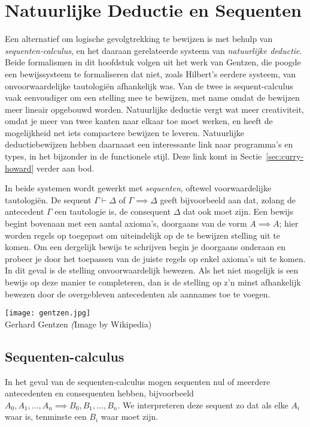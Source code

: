 \chapter{Natuurlijke Deductie en Sequenten}
Een alternatief om logische gevolgtrekking te bewijzen is met behulp van \emph{sequenten-calculus}, en het daaraan gerelateerde systeem van \emph{natuurlijke deductie}. Beide formalismen in dit hoofdstuk volgen uit het werk van Gentzen, die poogde een bewijssysteem te formaliseren dat niet, zoals Hilbert's eerdere systeem, van onvoorwaardelijke tautologi\"en afhankelijk was. Van de twee is sequent-calculus vaak eenvoudiger om een stelling mee te bewijzen, met name omdat de bewijzen meer lineair opgebouwd worden. Natuurlijke deductie vergt wat meer creativiteit, omdat je meer van twee kanten naar elkaar toe moet werken, en heeft de mogelijkheid net iets compactere bewijzen te leveren. Natuurlijke deductiebewijzen hebben daarnaast een interessante link naar programma's en types, in het bijzonder in de functionele stijl. Deze link komt in Sectie~\ref{sec:curry-howard} verder aan bod.

In beide systemen wordt gewerkt met \emph{sequenten}, oftewel voorwaardelijke tautologi\"en. De sequent $\Gamma \vdash \Delta$ of $\Gamma \implies \Delta$ geeft bijvoorbeeld aan dat, zolang de antecedent $\Gamma$ een tautologie is, de consequent $\Delta$ dat ook moet zijn. Een bewijs begint bovenaan met een aantal axioma's, doorgaans van de vorm $A \implies A$; hier worden regels op toegepast om uiteindelijk op de te bewijzen stelling uit te komen. Om een dergelijk bewijs te schrijven begin je doorgaans onderaan en probeer je door het toepassen van de juiste regels op enkel axioma's uit te komen. In dit geval is de stelling onvoorwaardelijk bewezen. Als het niet mogelijk is een bewijs op deze manier te completeren, dan is de stelling op z'n minst afhankelijk bewezen door de overgebleven antecedenten als aannames toe te voegen. 

  \begin{marginfigure}
\texttt{[image: gentzen.jpg]}\\
    Gerhard Gentzen {\scriptsize\emph (Image by Wikipedia)}\\[3mm]
  \end{marginfigure}

\section{Sequenten-calculus}
In het geval van de sequenten-calculus mogen sequenten nul of meerdere antecedenten en consequenten hebben, bijvoorbeeld $A_0, A_1, \dots, A_n \implies B_0, B_1, \dots, B_n$. We interpreteren deze sequent zo dat als elke $A_i$ waar is, tenminste een $B_i$ waar moet zijn.

